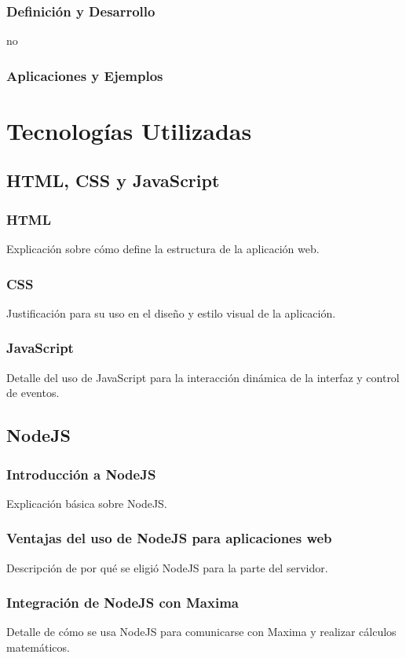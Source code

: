 \subsubsection{Definición y Desarrollo}
no
\subsubsection{Aplicaciones y Ejemplos}

\section{Tecnologías Utilizadas}

\subsection{HTML, CSS y JavaScript}
\subsubsection{HTML}
Explicación sobre cómo define la estructura de la aplicación web.
\subsubsection{CSS}
Justificación para su uso en el diseño y estilo visual de la aplicación.
\subsubsection{JavaScript}
Detalle del uso de JavaScript para la interacción dinámica de la interfaz y control de eventos.

\subsection{NodeJS}
\subsubsection{Introducción a NodeJS}
Explicación básica sobre NodeJS.
\subsubsection{Ventajas del uso de NodeJS para aplicaciones web}
Descripción de por qué se eligió NodeJS para la parte del servidor.
\subsubsection{Integración de NodeJS con Maxima}
Detalle de cómo se usa NodeJS para comunicarse con Maxima y realizar cálculos matemáticos.

